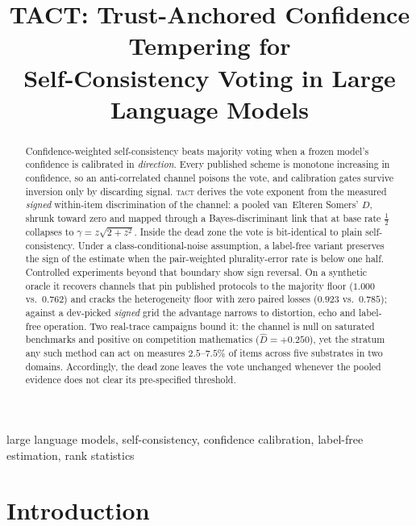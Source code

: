 \documentclass[conference]{IEEEtran}
\newcommand{\Dhat}{\widehat{D}}
\newcommand{\TACT}{\textsc{tact}}
\begin{document}
\title{TACT: Trust-Anchored Confidence Tempering for\\ Self-Consistency Voting in Large Language Models}

\author{
}

\maketitle

\begin{abstract}
Confidence-weighted self-consistency beats majority voting when a frozen
model's confidence is calibrated in \emph{direction}. Every published scheme is monotone increasing in confidence, so an
anti-correlated channel poisons the vote, and calibration gates survive
inversion only by discarding signal. \TACT{} derives the vote exponent from the measured
\emph{signed} within-item discrimination of the channel: a pooled
van~Elteren Somers' $D$, shrunk toward zero and mapped through a
Bayes-discriminant link that at base rate $\tfrac12$ collapses to
$\gamma=z\sqrt{2+z^2}$. Inside the dead zone the vote is
bit-identical to plain self-consistency. Under a class-conditional-noise
assumption, a label-free variant preserves the sign of the estimate when the
pair-weighted plurality-error rate is below one half. Controlled experiments
beyond that boundary show sign reversal. On a synthetic oracle it recovers channels that pin published protocols to
the majority floor ($1.000$ vs.\ $0.762$) and cracks the
heterogeneity floor with zero paired losses ($0.923$ vs.\ $0.785$); against a
dev-picked \emph{signed} grid the advantage narrows to distortion, echo and
label-free operation. Two real-trace campaigns bound it: the channel is null on saturated
benchmarks and positive on competition mathematics ($\Dhat=+0.250$), yet the
stratum any such method can act on measures $2.5$--$7.5\%$ of items across five
substrates in two domains. Accordingly, the dead zone leaves the vote unchanged
whenever the pooled evidence does not clear its pre-specified threshold.
\end{abstract}

\begin{IEEEkeywords}
large language models, self-consistency, confidence calibration, label-free estimation, rank statistics
\end{IEEEkeywords}

\section{Introduction}
\end{document}

